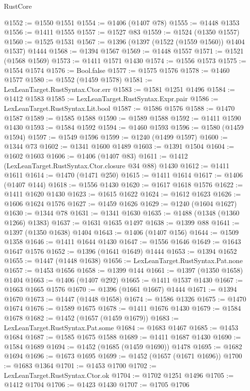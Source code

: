 \begin{lexlean}{RustCore}
\begin{coremodule}
@1552 := @1550 @1551
@1554 := @1406 (@1407 @78)
@1555 := @1448 @1353
@1556 := @1411 @1555
@1557 := @1527 @83
@1559 := @1524 (@1350 @1557)
@1560 := @1525 @1531
@1567 := @1396 (@1397 (@1522 (@1559 @1560)) @1404 @1537) @1444
@1568 := @1394 @1567
@1569 := @1448 @1557
@1571 := @1521 (@1568 @1569)
@1573 := @1411 @1571 @1430
@1574 := @1556 @1573
@1575 := @1554 @1574
@1576 := Bool.false
@1577 := @1575 @1576
@1578 := @1460 @1577
@1580 := @1552 (@1459 @1578)
@1581 := LexLeanTarget.RustSyntax.Ctor.err
@1583 := @1581 @1251 @1496
@1584 := @1412 @1583
@1585 := LexLeanTarget.RustSyntax.Expr.pair
@1586 := LexLeanTarget.RustSyntax.Lit.bool
@1587 := @1586 @1576
@1588 := @1470 @1587
@1589 := @1585 @1588
@1590 := @1589 @1588
@1592 := @1411 @1590 @1430
@1593 := @1584 @1592
@1594 := @1460 @1593
@1596 := @1580 (@1459 @1594)
@1597 := @1549 @1596
@1599 := @1240 (@1499 @1597)
@1600 := @1344 @73
@1602 := @1341 @1600 @1489
@1603 := @1391 @1504
@1604 := @1602 @1603
@1606 := @1406 (@1407 @83)
@1611 := @1412 (LexLeanTarget.RustSyntax.Ctor.closure @34 @88) @1430
@1612 := @1411 @1611
@1614 := @1470 (@1471 @250)
@1615 := @1411 @1614
@1617 := @1406 (@1407 @144)
@1618 := @1556 @1430
@1620 := @1617 @1618 @1576
@1622 := @1411 @1620 @1430
@1623 := @1615 @1622
@1624 := @1612 @1623
@1626 := @1606 @1624 @1576
@1627 := @1459 @1626
@1629 := @1240 (@1604 @1627)
@1630 := @1344 @78
@1631 := @1341 @1630
@1635 := @1488 (@1348 (@1360 @1266) @1383)
@1637 := @1631 @1635 @1497
@1638 := @1399 @88
@1641 := @1397 (@1350 @1638) @1404
@1643 := @1406 (@1407 @156)
@1644 := @1509 @1358
@1646 := @1411 @1644 @1430
@1647 := @1556 @1646
@1649 := @1643 @1647 @1576
@1652 := @1396 (@1641 @1649) @1444
@1653 := @1394 @1652
@1655 := @1447 (@1448 @1638)
@1656 := LexLeanTarget.RustSyntax.Pat.none
@1657 := @1453 @1656
@1658 := @1399 @144
@1661 := @1397 (@1350 @1658) @1404
@1663 := @1406 (@1407 @292)
@1665 := @1411 @1537 @1430
@1667 := @1663 @1665 @1576
@1670 := @1396 (@1661 @1667) @1444
@1671 := @1394 @1670
@1673 := @1447 (@1448 @1658)
@1674 := @1586 @1326
@1675 := @1470 @1674
@1676 := @1589 @1675
@1678 := @1411 @1676 @1430
@1679 := @1584 @1678
@1682 := @1452 (@1657 (@1459 @1679))
@1683 := LexLeanTarget.RustSyntax.Pat.some
@1684 := @1683 @1467
@1685 := @1453 @1684
@1687 := @1585 @1675 @1588
@1689 := @1411 @1687 @1430
@1690 := @1584 @1689
@1694 := @1452 (@1685 (@1459 @1690)) @1478
@1695 := @1682 @1694
@1696 := @1673 @1695
@1699 := @1452 (@1657 (@1671 @1696))
@1700 := @1683 @1364
@1701 := @1453 @1700
@1702 := LexLeanTarget.RustSyntax.Ctor.ok
@1704 := @1702 @1251 @1496
@1705 := @1412 @1704
@1706 := @1423 @1430
@1707 := @1705 @1706

\end{coremodule}
\end{lexlean}
